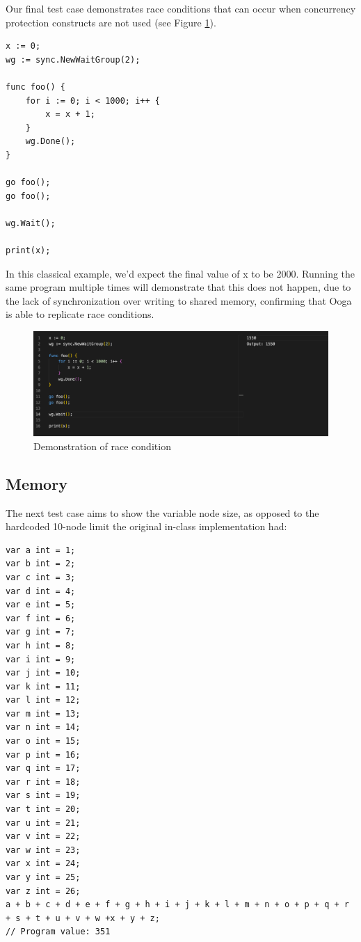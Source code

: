 \documentclass{report}
\begin{document}
Our final test case demonstrates race conditions that can occur when concurrency protection constructs are not used (see Figure \ref{fig:race-condition}).

\begin{verbatim}
x := 0;
wg := sync.NewWaitGroup(2);

func foo() {
    for i := 0; i < 1000; i++ {
        x = x + 1;
    }
    wg.Done();
}

go foo();
go foo();

wg.Wait();

print(x);
\end{verbatim}

In this classical example, we'd expect the final value of x to be 2000. Running the same program multiple times will demonstrate that this does not happen, due to the lack of synchronization over writing to shared memory, confirming that Ooga is able to replicate race conditions.

\begin{figure}
    \centering
    \includegraphics[width=\textwidth]{images/ooga-race-condition.png}
    \caption{Demonstration of race condition}
    \label{fig:race-condition}
\end{figure}

\subsection{Memory}

The next test case aims to show the variable node size, as opposed to the hardcoded 10-node limit the original in-class implementation had:
\begin{verbatim}
var a int = 1;
var b int = 2;
var c int = 3;
var d int = 4;
var e int = 5;
var f int = 6;
var g int = 7;
var h int = 8;
var i int = 9;
var j int = 10;
var k int = 11;
var l int = 12;
var m int = 13;
var n int = 14;
var o int = 15;
var p int = 16;
var q int = 17;
var r int = 18;
var s int = 19;
var t int = 20;
var u int = 21;
var v int = 22;
var w int = 23;
var x int = 24;
var y int = 25;
var z int = 26;
a + b + c + d + e + f + g + h + i + j + k + l + m + n + o + p + q + r + s + t + u + v + w +x + y + z;
// Program value: 351
\end{verbatim}
\end{document}
